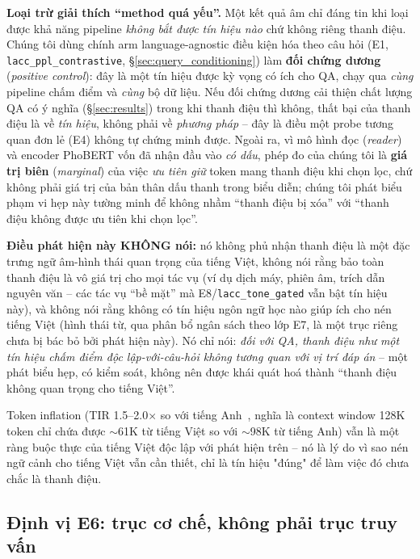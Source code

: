 \documentclass[12pt,a4paper]{article}
\begin{document}
\textbf{Loại trừ giải thích ``method quá yếu''.} Một kết quả âm chỉ đáng tin khi loại được khả năng pipeline \textit{không bắt được tín hiệu nào} chứ không riêng thanh điệu. Chúng tôi dùng chính arm language-agnostic điều kiện hóa theo câu hỏi (E1, \texttt{lacc\_ppl\_contrastive}, \S\ref{sec:query_conditioning}) làm \textbf{đối chứng dương} (\textit{positive control}): đây là một tín hiệu được kỳ vọng có ích cho QA, chạy qua \textit{cùng} pipeline chấm điểm và \textit{cùng} bộ dữ liệu. Nếu đối chứng dương cải thiện chất lượng QA có ý nghĩa (\S\ref{sec:results}) trong khi thanh điệu thì không, thất bại của thanh điệu là về \textit{tín hiệu}, không phải về \textit{phương pháp} -- đây là điều một probe tương quan đơn lẻ (E4) không tự chứng minh được. Ngoài ra, vì mô hình đọc (\textit{reader}) và encoder PhoBERT vốn đã nhận đầu vào \textit{có dấu}, phép đo của chúng tôi là \textbf{giá trị biên} (\textit{marginal}) của việc \textit{ưu tiên giữ} token mang thanh điệu khi chọn lọc, chứ không phải giá trị của bản thân dấu thanh trong biểu diễn; chúng tôi phát biểu phạm vi hẹp này tường minh để không nhầm ``thanh điệu bị xóa'' với ``thanh điệu không được ưu tiên khi chọn lọc''.

\textbf{Điều phát hiện này KHÔNG nói:} nó không phủ nhận thanh điệu là một đặc trưng ngữ âm-hình thái quan trọng của tiếng Việt, không nói rằng bảo toàn thanh điệu là vô giá trị cho mọi tác vụ (ví dụ dịch máy, phiên âm, trích dẫn nguyên văn -- các tác vụ ``bề mặt'' mà E8/\texttt{lacc\_tone\_gated} vẫn bật tín hiệu này), và không nói rằng không có tín hiệu ngôn ngữ học nào giúp ích cho nén tiếng Việt (hình thái từ, qua phân bổ ngân sách theo lớp E7, là một trục riêng chưa bị bác bỏ bởi phát hiện này). Nó chỉ nói: \textit{đối với QA, thanh điệu như một tín hiệu chấm điểm độc lập-với-câu-hỏi không tương quan với vị trí đáp án} -- một phát biểu hẹp, có kiểm soát, không nên được khái quát hoá thành ``thanh điệu không quan trọng cho tiếng Việt''.

Token inflation (TIR 1.5--2.0$\times$ so với tiếng Anh~\cite{lee2026equity}, nghĩa là context window 128K token chỉ chứa được $\sim$61K từ tiếng Việt so với $\sim$98K từ tiếng Anh) vẫn là một ràng buộc thực của tiếng Việt độc lập với phát hiện trên -- nó là lý do vì sao nén ngữ cảnh cho tiếng Việt vẫn cần thiết, chỉ là tín hiệu "đúng" để làm việc đó chưa chắc là thanh điệu.

\subsection{Định vị E6: trục cơ chế, không phải trục truy vấn}
\label{sec:e6_positioning}
\end{document}
